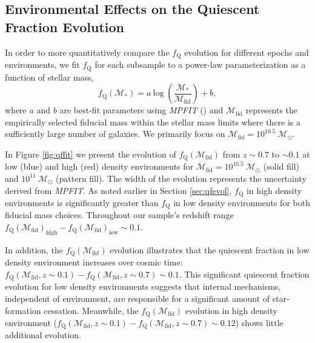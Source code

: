 \subsection{Environmental Effects on the Quiescent Fraction Evolution} \label{sec:env_qf_evol}
In order to more quantitatively compare the $f_{\mathrm{Q}}$ evolution for different epochs and environments, we fit $f_{\mathrm{Q}}$ for each subsample to a power-law parameterization as a function of stellar mass, 
\begin{equation} \label{eq:qffit}
f_{\mathrm{Q}}(\mathcal{M}_{*}) = a \: \mathrm{log} \; \left(\frac{ \mathcal{M}_{*}}{\mathcal{M}_{\mathrm{fid}}} \right)+b,
\end{equation}
where $a$ and $b$ are best-fit parameters using {\em MPFIT} (\citealt{Markwardt:2009aa}) and $\mathcal{M}_{\mathrm{fid}}$ represents the empirically selected fiducial mass within the stellar mass limits where there is a sufficiently large number of galaxies. We primarily focus on $\mathcal{M}_{\mathrm{fid}} = 10^{10.5} \: \mathcal{M}_{\odot}$. 

In Figure \ref{fig:qffit} we present the evolution of
$f_{\mathrm{Q}}(\mathcal{M}_{\mathrm{fid}})$ from $z \sim 0.7$ to $\sim 0.1$
at low (blue) and high (red) density environments for
$\mathcal{M}_{\mathrm{fid}} = 10^{10.5} \: \mathcal{M}_{\odot}$ (solid
fill) and $10^{11} \: \mathcal{M}_{\odot}$ (pattern fill). The width
of the evolution represents the uncertainty derived from {\em
  MPFIT}. As noted earlier in Section \ref{sec:qfevol}, $f_{\mathrm{Q}}$
in high density environments is significantly greater than
$f_{\mathrm{Q}}$ in low density environments for both fiducial mass
choices. Throughout our sample's redshift range
$f_{\mathrm{Q}}(\mathcal{M}_{\mathrm{fid}})_{\mathrm{high}} -
f_{\mathrm{Q}}(\mathcal{M}_{\mathrm{fid}})_{\mathrm{low}} \sim 0.1$.

In addition, the $f_{\mathrm{Q}}(\mathcal{M}_{\mathrm{fid}})$
evolution illustrates that the quiescent fraction in low density
environment increases over cosmic time:
$f_{\mathrm{Q}}(\mathcal{M}_{\mathrm{fid}}, z \sim 0.1) -
f_{\mathrm{Q}}(\mathcal{M}_{\mathrm{fid}}, z \sim 0.7) \sim 0.1$. This
significant quiescent fraction evolution for low density environments
suggests that internal mechanisms, independent of environment, are
responsible for a significant amount of star-formation cessation. Meanwhile, the $f_{\mathrm{Q}}(\mathcal{M}_{\mathrm{fid}})$ evolution in high density environment ($f_{\mathrm{Q}}(\mathcal{M}_{\mathrm{fid}}, z \sim 0.1) - f_{\mathrm{Q}}(\mathcal{M}_{\mathrm{fid}}, z \sim 0.7) \sim 0.12$) shows little additional evolution.

